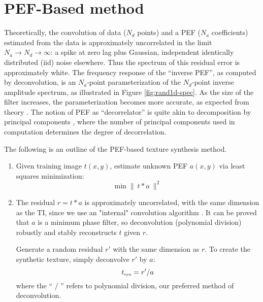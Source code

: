 \section{ PEF-Based method}

	Theoretically, the convolution of data ($N_d$ points) and a PEF ($N_a$ coefficients)
  estimated from the data is approximately uncorrelated in the limit 
	$N_a \rightarrow N_d \rightarrow \infty$: a spike at zero lag plus Gaussian, independent 
	identically distributed (iid) noise elsewhere.  
	Thus the spectrum of this residual error is approximately white.
	The frequency response of the ``inverse PEF'', as computed by deconvolution, is an 
	$N_a$-point parameterization of the $N_d$-point inverse amplitude spectrum, as illustrated 
	in Figure \ref{fig:rand1d-spec}.  As the size of the filter increases, the parameterization 
	becomes more accurate, as expected from theory {\small \cite[]{fgdp}}.  The notion of PEF
	as ``decorrelator'' is quite akin to decomposition by principal components 
	{\small \cite[]{castleman}},
	where the number of principal components used in computation determines the degree of 
	decorrelation.


	\par
	The following is an outline of the PEF-based texture synthesis method.
	\begin{enumerate}
		\item Given training image $t(x,y)$, estimate unknown PEF $a(x,y)$ via least 
		      squares minimization:
			\begin{equation}	
				\mbox{min} \; \| \ t*a \ \|^2  \label{eq:pefest}
			\end{equation}
		\item The residual $r = t*a$ is approximately uncorrelated, with the same dimension as the TI,
			since we use an "internal" convolution algorithm {\small \cite[]{gee}}.
			It can be proved that $a$ is a minimum phase filter, {\small \cite[]{fgdp}} so 
			deconvolution (polynomial division) robustly and stably reconstructs $t$ given $r$.

			Generate a random residual $r'$ with the same dimension as $r$.  To create the 
			synthetic texture, simply deconvolve $r'$ by $a$:
			\begin{equation}
				t_{\mbox{\tiny syn}} = r'/a  \label{eq:pefsyn}
			\end{equation}
			where the `` / '' refers to polynomial division, our preferred method of deconvolution.
	\end{enumerate}

